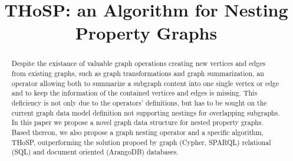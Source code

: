 


\begin{abstract}
Despite the existance of valuable graph operations creating new
vertices and edges from existing graphs, such as graph
transformations and graph summarization, an operator allowing
both to summarize a subgraph content into one single vertex or edge
and to keep the information of the contained vertices and edges is
missing. This deficiency is not only due to the operators’ definitions,
but has to be sought on the current graph data model definition not
supporting nestings for overlapping subgraphs. In this paper we
propose a novel graph data structure for nested property graphs.
Based thereon, we also propose a graph nesting operator and a specific algorithm, THoSP, outperforming the solution propoed by graph (Cypher, SPARQL) relational (SQL) and document oriented (ArangoDB) databases.
\end{abstract}


\title{THoSP: an Algorithm for Nesting Property Graphs}


